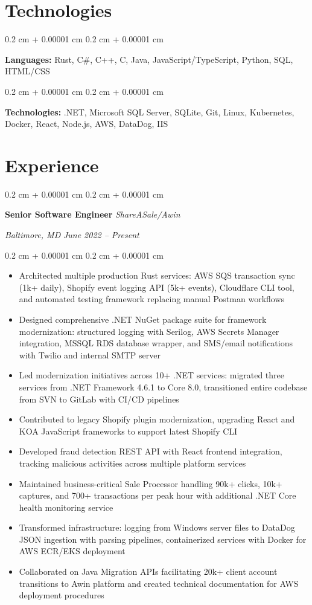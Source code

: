 \documentclass[10pt, letterpaper]{article}
\newenvironment{highlights}{
    \begin{itemize}[
        topsep=0.10 cm,
        parsep=0.10 cm,
        partopsep=0pt,
        itemsep=0pt,
        leftmargin=0.4 cm + 10pt
        ]
    }{
\end{itemize}
} %
\newenvironment{onecolentry}{
    \begin{adjustwidth}{
            0.2 cm + 0.00001 cm
        }{
            0.2 cm + 0.00001 cm
        }
    }{
    \end{adjustwidth}
} %
\newenvironment{twocolentry}[2][]{
    \onecolentry
    \def\secondColumn{#2}
    \setcolumnwidth{\fill, 10.5 cm}
    \begin{paracol}{2}
    }{
        \switchcolumn \raggedleft \secondColumn
    \end{paracol}
    \endonecolentry
} %
\begin{document}
\section{Technologies}
\begin{onecolentry}
    \textbf{Languages:} Rust, C\#, C++, C, Java, JavaScript/TypeScript, Python, SQL, HTML/CSS
\end{onecolentry}
\vspace{0.2 cm}
\begin{onecolentry}
    \textbf{Technologies:} .NET, Microsoft SQL Server, SQLite, Git, Linux, Kubernetes, Docker, React, Node.js, AWS, DataDog, IIS
\end{onecolentry}
\section{Experience}
\begin{twocolentry}{
    \textit{Baltimore, MD}
    \textit{June 2022 – Present}}
    \textbf{Senior Software Engineer}
    \textit{ShareASale/Awin}
\end{twocolentry}
\begin{onecolentry}
    \begin{highlights}
        \item Architected multiple production Rust services: AWS SQS transaction sync (1k+ daily), Shopify event logging API (5k+ events), Cloudflare CLI tool, and automated testing framework replacing manual Postman workflows
        \item Designed comprehensive .NET NuGet package suite for framework modernization: structured logging with Serilog, AWS Secrets Manager integration, MSSQL RDS database wrapper, and SMS/email notifications with Twilio and internal SMTP server
        \item Led modernization initiatives across 10+ .NET services: migrated three services from .NET Framework 4.6.1 to Core 8.0, transitioned entire codebase from SVN to GitLab with CI/CD pipelines
        \item Contributed to legacy Shopify plugin modernization, upgrading React and KOA JavaScript frameworks to support latest Shopify CLI
        \item Developed fraud detection REST API with React frontend integration, tracking malicious activities across multiple platform services
        \item Maintained business-critical Sale Processor handling 90k+ clicks, 10k+ captures, and 700+ transactions per peak hour with additional .NET Core health monitoring service
        \item Transformed infrastructure: logging from Windows server files to DataDog JSON ingestion with parsing pipelines, containerized services with Docker for AWS ECR/EKS deployment
        \item Collaborated on Java Migration APIs facilitating 20k+ client account transitions to Awin platform and created technical documentation for AWS deployment procedures
        \end{highlights}
\end{onecolentry}
\end{document}
